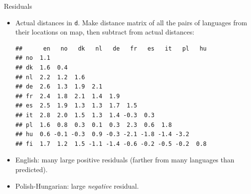 \begin{frame}[fragile]{Residuals}

  \begin{itemize}
  \item Actual distances in \texttt{d}. Make distance matrix of all
    the pairs of languages from their locations on map, then subtract
    from actual distances:
  {\small
\begin{knitrout}
\color{fgcolor}\begin{kframe}
\begin{alltt}
\hlkwb{=}\hlopt{$}
\hlopt{-}\hlstd{)}
\end{alltt}
\begin{verbatim}
##      en   no   dk   nl   de   fr   es   it   pl   hu
## no  1.1                                             
## dk  1.6  0.4                                        
## nl  2.2  1.2  1.6                                   
## de  2.6  1.3  1.9  2.1                              
## fr  2.4  1.8  2.1  1.4  1.9                         
## es  2.5  1.9  1.3  1.3  1.7  1.5                    
## it  2.8  2.0  1.5  1.3  1.4 -0.3  0.3               
## pl  1.6  0.8  0.3  0.1  0.3  2.3  0.6  1.8          
## hu  0.6 -0.1 -0.3  0.9 -0.3 -2.1 -1.8 -1.4 -3.2     
## fi  1.7  1.2  1.5 -1.1 -1.4 -0.6 -0.2 -0.5 -0.2  0.8
\end{verbatim}
\end{kframe}
\end{knitrout}
}

\item English: many large positive residuals (farther from many
  languages than predicted).
\item Polish-Hungarian: large \emph{negative} residual.
    
  \end{itemize}
  
\end{frame}

